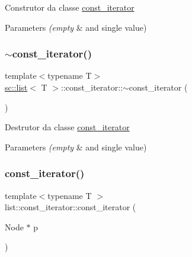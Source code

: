 Construtor da classe \mbox{\hyperlink{classsc_1_1list_1_1const__iterator}{const\+\_\+iterator}} 
\begin{DoxyParams}{Parameters}
{\em (empty} & and single value) \\
\hline
\end{DoxyParams}
\mbox{\label{classsc_1_1list_1_1const__iterator_a2a8ca8f4d9e7df000821825d0971c65b}} 
\subsubsection{\texorpdfstring{$\sim$const\+\_\+iterator()}{~const\_iterator()}}
{\footnotesize\ttfamily template$<$typename T$>$ \\
\mbox{\hyperlink{classsc_1_1list}{sc\+::list}}$<$ T $>$\+::const\+\_\+iterator\+::$\sim$const\+\_\+iterator (\begin{DoxyParamCaption}{ }\end{DoxyParamCaption})\hspace{0.3cm}{\ttfamily [default]}}

Destrutor da classe \mbox{\hyperlink{classsc_1_1list_1_1const__iterator}{const\+\_\+iterator}} 
\begin{DoxyParams}{Parameters}
{\em (empty} & and single value) \\
\hline
\end{DoxyParams}
\mbox{\label{classsc_1_1list_1_1const__iterator_a72c4f8d017e53d713629bec30ce0d1a9}} 
\subsubsection{\texorpdfstring{const\+\_\+iterator()}{const\_iterator()}\hspace{0.1cm}{\footnotesize\ttfamily [2/2]}}
{\footnotesize\ttfamily template$<$typename T $>$ \\
list\+::const\+\_\+iterator\+::const\+\_\+iterator (\begin{DoxyParamCaption}\item[{Node $\ast$}]{p }\end{DoxyParamCaption})\hspace{0.3cm}{\ttfamily [protected]}}



